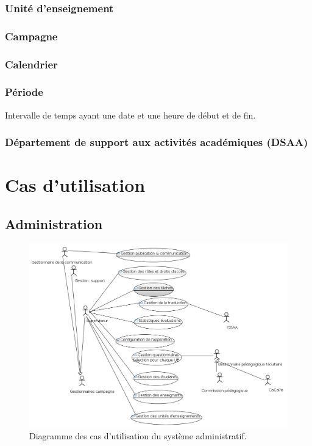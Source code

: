 \documentclass[a4paper,11pt]{report}
\begin{document}
\subsection{Unité d'enseignement}

\subsection{Campagne}

\subsection{Calendrier}

\subsection{Période}
Intervalle de temps ayant une date et une heure de début et de fin.

\subsection{Département de support aux activités académiques (DSAA)}















\chapter{Cas d'utilisation}

\section{Administration}

\begin{figure}[ht]
\includegraphics[width=\linewidth]{workspace/evalens-usecases/administration.png}
\caption{Diagramme des cas d'utilisation du système administratif.}
\label{fig:usecase-admin}
\end{figure}
\end{document}
